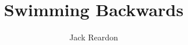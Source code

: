 \documentclass{scrbook}
\author{Jack Reardon}
\title{Swimming Backwards}
\date{}
\begin{document}
\maketitle







\tableofcontents
\titlemark


\end{document}
